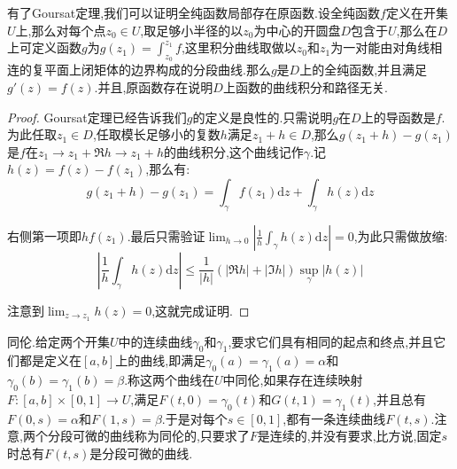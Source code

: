 有了Goursat定理,我们可以证明全纯函数局部存在原函数.设全纯函数$f$定义在开集$U$上,那么对每个点$z_0\in U$,取足够小半径的以$z_0$为中心的开圆盘$D$包含于$U$,那么在$D$上可定义函数$g$为$g(z_1)=\int_{z_0}^{z_1}f$,这里积分曲线取做以$z_0$和$z_1$为一对能由对角线相连的复平面上闭矩体的边界构成的分段曲线.那么$g$是$D$上的全纯函数,并且满足$g'(z)=f(z)$.并且,原函数存在说明$D$上函数的曲线积分和路径无关.
\begin{proof}
	
	Goursat定理已经告诉我们$g$的定义是良性的.只需说明$g$在$D$上的导函数是$f$.为此任取$z_1\in D$,任取模长足够小的复数$h$满足$z_1+h\in D$,那么$g(z_1+h)-g(z_1)$是$f$在$z_1\to z_1+\Re h\to z_1+h$的曲线积分,这个曲线记作$\gamma$.记$h(z)=f(z)-f(z_1)$,那么有:
	$$g(z_1+h)-g(z_1)=\int_{\gamma}f(z_1)\mathrm{d}z+\int_{\gamma}h(z)\mathrm{d}z$$
	
	右侧第一项即$hf(z_1)$.最后只需验证$\lim_{h\to0}\left|\frac{1}{h}\int_{\gamma}h(z)\mathrm{d}z\right|=0$,为此只需做放缩:
	$$\left|\frac{1}{h}\int_{\gamma}h(z)\mathrm{d}z\right|\le\frac{1}{|h|}\left(|\Re h|+|\Im h|\right)\sup_{\gamma}|h(z)|$$
	
	注意到$\lim_{z\to z_1}h(z)=0$,这就完成证明.
\end{proof}

同伦.给定两个开集$U$中的连续曲线$\gamma_0$和$\gamma_1$,要求它们具有相同的起点和终点,并且它们都是定义在$[a,b]$上的曲线,即满足$\gamma_0(a)=\gamma_1(a)=\alpha$和$\gamma_0(b)=\gamma_1(b)=\beta$.称这两个曲线在$U$中同伦,如果存在连续映射$F:[a,b]\times[0,1]\to U$,满足$F(t,0)=\gamma_0(t)$和$G(t,1)=\gamma_1(t)$,并且总有$F(0,s)=\alpha$和$F(1,s)=\beta$.于是对每个$s\in[0,1]$,都有一条连续曲线$F(t,s)$.注意,两个分段可微的曲线称为同伦的,只要求了$F$是连续的,并没有要求,比方说,固定$s$时总有$F(t,s)$是分段可微的曲线.


